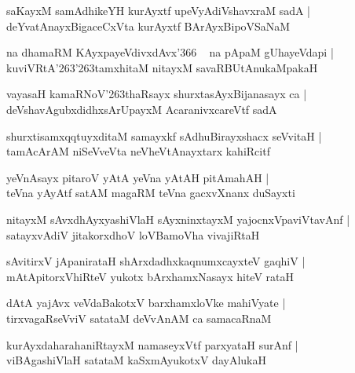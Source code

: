 \documentclass[twoside,12pt,openright]{book}
\def\S{\char'263}
\newcounter{shloka}[chapter]
\begin{document}
\begin{shloka}
saKayxM samAdhikeYH kurAyxtf upeVyAdiVshavxraM sadA |\\
deYvatAnayxBigaceCxVta kurAyxtf BArAyxBipoVSaNaM 
\end{shloka}

\begin{shloka}
na dhamaRM KAyxpayeVdivxdAvx\char'366 ~ na pApaM gUhayeVdapi |\\
kuviVRtA\S\S tamxhitaM nitayxM savaRBUtAnukaMpakaH 
\end{shloka}

\begin{shloka}
vayasaH kamaRNoV\S thaRsayx shurxtasAyxBijanasayx ca |\\
deVshavAgubxdidhxsArUpayxM AcaranivxcareVtf sadA 
\end{shloka}

\begin{shloka}
shurxtisamxqqtuyxditaM samayxkf sAdhuBirayxshacx seVvitaH |\\
tamAcArAM niSeVveVta neVheVtAnayxtarx kahiRcitf
\end{shloka}

\begin{shloka}
yeVnAsayx pitaroV yAtA yeVna yAtAH pitAmahAH |\\
teVna yAyAtf satAM magaRM teVna gacxvXnanx duSayxti 
\end{shloka}

\begin{shloka}
nitayxM sAvxdhAyxyashiVlaH sAyxninxtayxM yajocnxVpaviVtavAnf |\\
satayxvAdiV jitakorxdhoV loVBamoVha vivajiRtaH 
\end{shloka}

\begin{shloka}
sAvitirxV jApanirataH shArxdadhxkaqnumxcayxteV gaqhiV |\\
mAtApitorxVhiRteV yukotx bArxhamxNasayx hiteV rataH 
\end{shloka}

\begin{shloka}
dAtA yajAvx veVdaBakotxV barxhamxloVke mahiVyate |\\
tirxvagaRseVviV satataM deVvAnAM ca samacaRnaM 
\end{shloka}

\begin{shloka}
kurAyxdaharahaniRtayxM namaseyxVtf parxyataH surAnf |\\
viBAgashiVlaH satataM kaSxmAyukotxV dayAlukaH 
\end{shloka}
\end{document}
